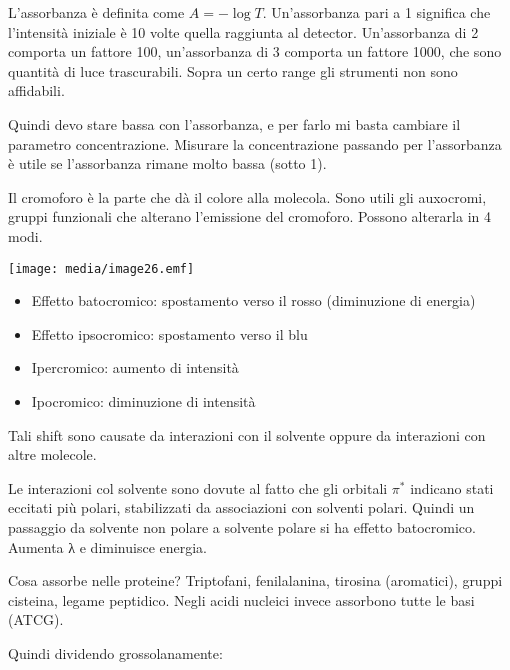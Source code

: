 L'assorbanza è definita come \(A = - \log T\). Un'assorbanza pari a 1
significa che l'intensità iniziale è 10 volte quella raggiunta al
detector. Un'assorbanza di 2 comporta un fattore 100, un'assorbanza di 3
comporta un fattore 1000, che sono quantità di luce trascurabili. Sopra
un certo range gli strumenti non sono affidabili.

Quindi devo stare bassa con l'assorbanza, e per farlo mi basta cambiare
il parametro concentrazione. Misurare la concentrazione passando per
l'assorbanza è utile se l'assorbanza rimane molto bassa (sotto 1).

Il cromoforo è la parte che dà il colore alla molecola. Sono utili gli
auxocromi, gruppi funzionali che alterano l'emissione del cromoforo.
Possono alterarla in 4 modi.

\texttt{[image: media/image26.emf]}

\begin{itemize}
\item
  Effetto batocromico: spostamento verso il rosso (diminuzione di
  energia)
\item
  Effetto ipsocromico: spostamento verso il blu
\item
  Ipercromico: aumento di intensità
\item
  Ipocromico: diminuzione di intensità
\end{itemize}

Tali shift sono causate da interazioni con il solvente oppure da
interazioni con altre molecole.

Le interazioni col solvente sono dovute al fatto che gli orbitali
\(\pi^{*}\) indicano stati eccitati più polari, stabilizzati da
associazioni con solventi polari. Quindi un passaggio da solvente non
polare a solvente polare si ha effetto batocromico. Aumenta λ e
diminuisce energia.

Cosa assorbe nelle proteine? Triptofani, fenilalanina, tirosina
(aromatici), gruppi cisteina, legame peptidico. Negli acidi nucleici
invece assorbono tutte le basi (ATCG).

Quindi dividendo grossolanamente:

